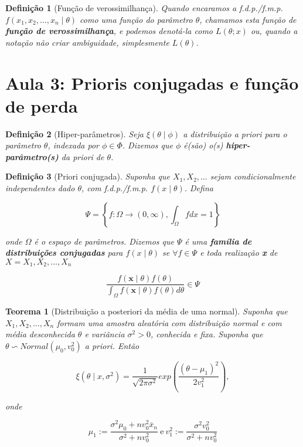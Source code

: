 \documentclass{article}
\newtheorem{theorem}{Teorema}
\newtheorem{definition}{Definição}
\begin{document}
\begin{definition}[Função de verossimilhança]
Quando encaramos a f.d.p./f.m.p. $f(x_1, x_2, \ldots, x_n \mid \theta)$ como uma função do parâmetro $\theta$, chamamos esta função de \textbf{função de verossimilhança}, e podemos denotá-la como $L(\theta; x)$ ou, quando a notação não criar ambiguidade, simplesmente $L(\theta)$.
\end{definition}

\section*{Aula 3: Prioris conjugadas e função de perda}
\begin{definition}[Hiper-parâmetros]
Seja $\xi(\theta \mid \phi)$ a distribuição a priori para o parâmetro $\theta$, indexada por $\phi \in \Phi$. Dizemos que $\phi$ é(são) o(s) \textbf{hiper-parâmetro(s)} da priori de $\theta$.
\end{definition}

\begin{definition}[Priori conjugada]
Suponha que $X_1, X_2, \ldots$ sejam condicionalmente independentes dado $\theta$, com f.d.p./f.m.p. $f(x\mid\theta)$. Defina

\begin{equation}
\Psi = \left \{ f: \Omega \rightarrow (0, \infty), \int_\Omega f dx = 1 \right \}
\end{equation}

onde $\Omega$ é o espaço de parâmetros. Dizemos que $\Psi$ é uma \textbf{família de distribuições conjugadas} para $f(x \mid \theta)$ se $\forall f \in \Psi$ e toda realização \textbf{x} de $X = X_1, X_2, \ldots, X_n$

\begin{equation}
\frac{f(\textbf{x} \mid \theta) f(\theta)}{\int_\Omega f(\textbf{x} \mid \theta)f(\theta) d \theta} \in \Psi
\end{equation}
\end{definition}

\begin{theorem}[Distribuição a posteriori da média de uma normal]
Suponha que $X_1, X_2, \ldots, X_n$ formam uma amostra aleatória com distribuição normal e com média desconhecida $\theta$ e variância $\sigma^2 > 0$, conhecida e fixa. Suponha que $\theta \backsim Normal(\mu_0, v_0^2)$ a priori. Então

\begin{equation}
\xi (\theta \mid x, \sigma^2) = \frac{1}{\sqrt{2 \pi \sigma^2}} exp \left (\frac{(\theta - \mu_1)^2}{2v_1^2}\right ),
\end{equation}

onde

\begin{equation}
\mu_1 := \frac{\sigma^2 \mu_0 + n v_0^2 \overline{x}_n}{\sigma^2 + n v_ 0^2} \ \mathrm{e} \ v_1^2 := \frac{\sigma^2 v_0^2}{\sigma^2 + n v_0^2}
\end{equation}
\end{theorem}
\end{document}
